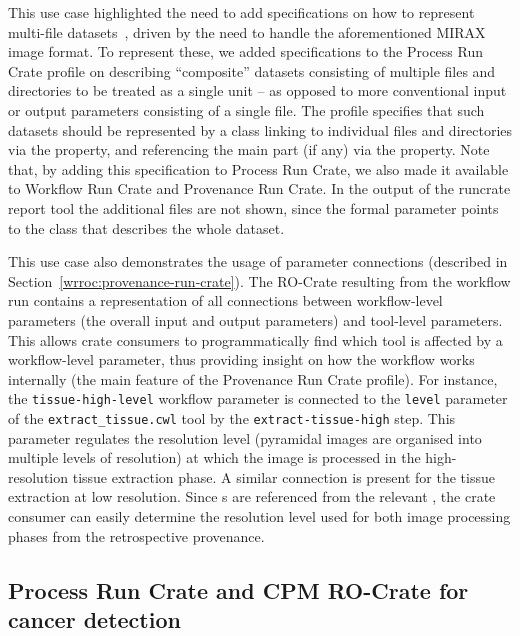 This use case highlighted the need to add specifications on how to represent multi-file datasets~\cite[section ``Representing multi-file objects"]{WRROC 2024a}, driven by the need to handle the aforementioned MIRAX image format.
To represent these, we added specifications to the Process Run Crate profile on describing “composite” datasets consisting of multiple files and directories to be treated as a single unit -- as opposed to more conventional input or output parameters consisting of a single file. The profile specifies that such datasets should be represented by a  class linking to individual files and directories via the  property, and referencing the main part (if any) via the  property. Note that, by adding this specification to Process Run Crate, we also made it available to Workflow Run Crate and Provenance Run Crate. In the output of the runcrate report tool the additional files are not shown, since the formal parameter points to the  class that describes the whole dataset.

This use case also demonstrates the usage of parameter connections (described in Section~\ref{wrroc:provenance-run-crate}). The RO-Crate resulting from the workflow run contains a representation of all connections between workflow-level parameters (the overall input and output parameters) and tool-level parameters. This allows crate consumers to programmatically find which tool is affected by a workflow-level parameter, thus providing insight on how the workflow works internally (the main feature of the Provenance Run Crate profile). For instance, the \texttt{tissue-high-level} workflow parameter is connected to the \texttt{level} parameter of the \texttt{extract\_tissue.cwl} tool by the \texttt{extract-tissue-high} step. This parameter regulates the resolution level (pyramidal images are organised into multiple levels of resolution) at which the image is processed in the high-resolution tissue extraction phase. A similar connection is present for the tissue extraction at low resolution. Since s are referenced from the relevant , the crate consumer can easily determine the resolution level used for both image processing phases from the retrospective provenance.

\subsection{Process Run Crate and CPM RO-Crate for cancer detection}\label{wrroc:process-run-crate-and-cpm-ro-crate-for-cancer-detection}

